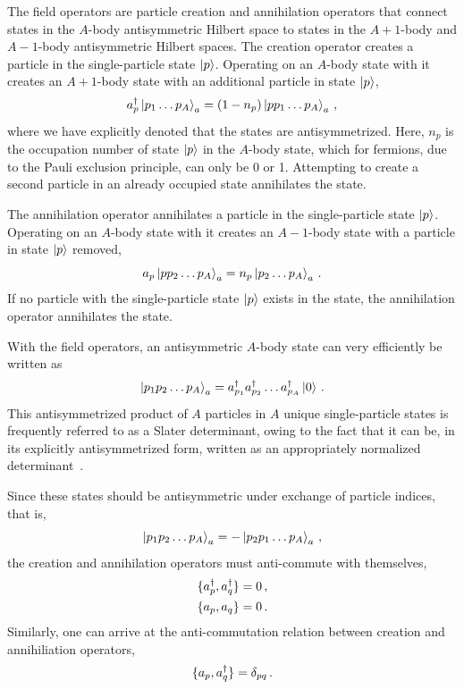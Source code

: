 The field operators are particle creation and annihilation operators
that connect states in the $A$-body antisymmetric Hilbert space
to states in the $A+1$-body and $A-1$-body antisymmetric Hilbert spaces.
The creation operator  creates a particle in the single-particle state $\ket{p}$.
Operating on an $A$-body state with it creates an $A+1$-body state
with an additional particle in state $\ket{p}$,
\begin{equation}
  a_{p}^{\dagger} \ket{p_1 \ldots p_{A}}_a = (1 - n_{p}) \ket{p p_1 \ldots p_{A}}_a\,,
\end{equation}
where we have explicitly denoted that the states are antisymmetrized.
Here, $n_p$ is the occupation number of state $\ket{p}$ in the $A$-body state,
which for fermions, due to the Pauli exclusion principle, can only be 0 or 1.
Attempting to create a second particle in an already occupied state annihilates the state.

The annihilation operator  annihilates a particle in the single-particle state $\ket{p}$.
Operating on an $A$-body state with it creates an $A-1$-body state
with a particle in state $\ket{p}$ removed,
\begin{equation}
  a_{p} \ket{p p_2 \ldots p_A}_a = n_p \ket{p_2 \ldots p_A}_a\,.
\end{equation}
If no particle with the single-particle state $\ket{p}$ exists in the state,
the annihilation operator annihilates the state.

With the field operators, an antisymmetric $A$-body state can very efficiently be written as
\begin{equation}
  \ket{p_1 p_2 \ldots p_A}_a = a_{p_1}^{\dagger} a_{p_2}^{\dagger} \ldots a_{p_A}^{\dagger} \ket{0}\,.
\end{equation}
This antisymmetrized product of $A$ particles in $A$ unique single-particle states
is frequently referred to as a Slater determinant,
owing to the fact that it can be, in its explicitly antisymmetrized form,
written as an appropriately normalized determinant~\cite{Slat29sladet}.

Since these states should be antisymmetric under exchange of particle indices, that is,
\begin{equation}
  \ket{p_1 p_2 \ldots p_A}_a = - \ket{p_2 p_1 \ldots p_A}_a\,,
\end{equation}
the creation and annihilation operators must anti-commute with themselves,
\begin{align}
  \{a_{p}^{\dagger}, a_{q}^{\dagger}\} = 0\,, \\
  \{a_{p}, a_{q}\} = 0\,.
\end{align}
Similarly, one can arrive at the anti-commutation relation
between creation and annihiliation operators,
\begin{equation}
  \{a_{p}, a_{q}^{\dagger}\} = \delta_{pq}\,.
\end{equation}

